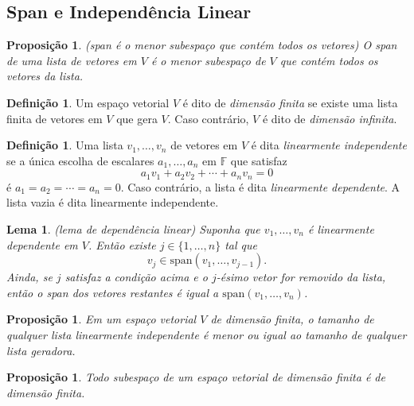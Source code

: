 \documentclass[12pt]{article}
\theoremstyle{plain}
\newtheorem{prop}[thm]{Proposição}
\newtheorem{lem}[thm]{Lema}
\theoremstyle{definition}
\newtheorem{defn}[thm]{Definição}
\theoremstyle{remark}
\begin{document}
\subsection{Span e Independência Linear}
\begin{prop} (span é o menor subespaço que contém todos os vetores)
    O span de uma lista de vetores em \(V\) é o menor subespaço de \(V\) que contém todos os vetores da lista.
\end{prop}

\begin{defn}
    Um espaço vetorial \(V\) é dito de \emph{dimensão finita} se existe uma lista finita de vetores em \(V\) que gera \(V\). Caso contrário, \(V\) é dito de \emph{dimensão infinita}.
\end{defn}

\begin{defn}
    Uma lista \(v_1, \ldots, v_n\) de vetores em \(V\) é dita \emph{linearmente independente} se a única escolha de escalares \(a_1, \ldots, a_n\) em \(\mathbb{F}\) que satisfaz
    \begin{equation}
        a_1 v_1 + a_2 v_2 + \cdots + a_n v_n = 0
    \end{equation}
    \noindent é \(a_1 = a_2 = \cdots = a_n = 0\). Caso contrário, a lista é dita \emph{linearmente dependente}. A lista vazia é dita linearmente independente.
\end{defn}

\begin{lem} (lema de dependência linear)
    Suponha que \(v_1, \ldots, v_n\) é linearmente dependente em \(V\). Então existe \(j \in \{1, \ldots, n\}\) tal que
    \begin{equation}
        v_j \in \text{span}(v_1, \ldots, v_{j-1}).
    \end{equation}
    \noindent Ainda, se \(j\) satisfaz a condição acima e o \(j\)-ésimo vetor for removido da lista, então o span dos vetores restantes é igual a \(\text{span}(v_1, \ldots, v_n)\).
\end{lem}

\begin{prop}
    Em um espaço vetorial \(V\) de dimensão finita, o tamanho de qualquer lista linearmente independente é menor ou igual ao tamanho de qualquer lista geradora.
\end{prop}

\begin{prop}
    Todo subespaço de um espaço vetorial de dimensão finita é de dimensão finita.
\end{prop}
\end{document}
